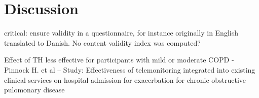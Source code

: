 \section{Discussion}

critical: ensure validity in a questionnaire, for instance originally in English translated to Danish. No content validity index was computed? 




Effect of TH less effective for participants with mild or moderate COPD - Pinnock H. et al -- Study: Effectiveness of telemonitoring integrated into existing clinical services on hospital admission for exacerbation for chronic obstructive pulomonary disease
